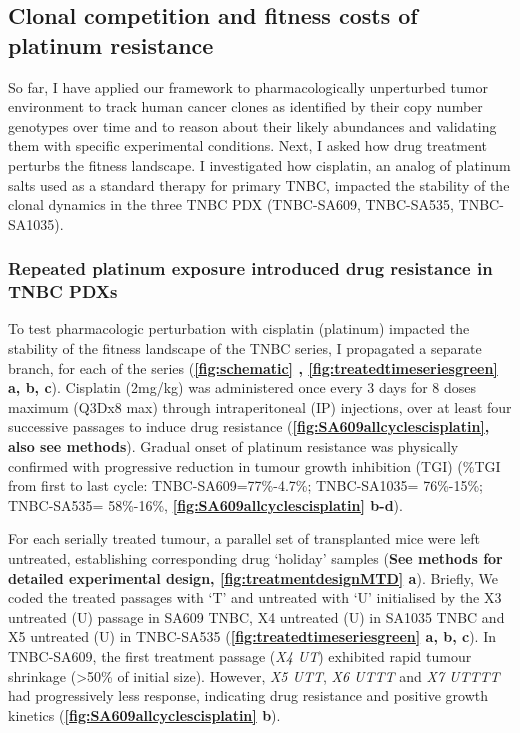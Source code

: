 \subsection{Clonal competition and fitness costs of platinum resistance}
So far, I have applied our framework to pharmacologically unperturbed tumor environment to track human cancer clones as identified by their copy number genotypes over time and to reason about their likely abundances and validating them with specific experimental conditions. Next, I asked how drug treatment perturbs the fitness landscape. I investigated how cisplatin, an analog of platinum salts used as a standard therapy for primary TNBC, impacted the stability of the clonal dynamics in the three TNBC PDX (TNBC-SA609, TNBC-SA535, TNBC-SA1035).


\subsubsection{Repeated platinum exposure introduced drug resistance in TNBC PDXs} 
 To test pharmacologic perturbation with cisplatin (platinum) impacted the stability of the fitness landscape of the TNBC series, I propagated a separate branch, for each of the series (\textbf{\autoref{fig:schematic} , \autoref{fig:treatedtimeseriesgreen} a, b, c}). Cisplatin (2mg/kg) was administered once every 3 days for 8 doses maximum (Q3Dx8 max) through intraperitoneal (IP) injections, over at least four successive passages to induce drug resistance  (\textbf{\autoref{fig:SA609allcyclescisplatin}, also see methods}). Gradual onset of platinum resistance was physically confirmed with progressive reduction in tumour growth inhibition (TGI) \cite{hather2014growth} (\%TGI from first to last cycle: TNBC-SA609=77\%-4.7\%; TNBC-SA1035= 76\%-15\%; TNBC-SA535= 58\%-16\%, \textbf{\autoref{fig:SA609allcyclescisplatin} b-d}).
 
 For each serially treated tumour, a parallel set of transplanted mice were left untreated, establishing corresponding drug `holiday' samples (\textbf{See methods for detailed experimental design, \textbf{\autoref{fig:treatmentdesignMTD} a}}). Briefly, We coded the treated passages with `T' and untreated with `U' initialised by the X3 untreated (U) passage in SA609 TNBC, X4 untreated (U) in SA1035 TNBC and X5 untreated (U) in  TNBC-SA535 (\textbf{\autoref{fig:treatedtimeseriesgreen} a, b, c}). In TNBC-SA609, the first treatment passage (\textit{X4 UT}) exhibited rapid tumour shrinkage (>50\% of initial size). However, \textit{X5 UTT}, \textit{X6 UTTT} and \textit{X7 UTTTT} had progressively less response, indicating drug resistance and positive growth kinetics (\textbf{\autoref{fig:SA609allcyclescisplatin} b}).


